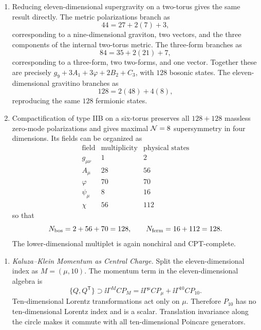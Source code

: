 \begin{enumerate}
\begin{enumerate}
      In either theory the fermions become two nine-dimensional
      gravitini and four spinors:
      \[
        2(48)+4(8)=128.
      \]
      Nine-dimensional spinors have no chirality label analogous to the
      ten-dimensional one.  The opposite-chirality IIA and
      same-chirality IIB assignments therefore reduce to the same
      nonchiral maximal nine-dimensional multiplet.
    \item Reducing eleven-dimensional supergravity on a two-torus gives
      the same result directly.  The metric polarizations branch as
      \[
        44=27+2(7)+3,
      \]
      corresponding to a nine-dimensional graviton, two vectors, and
      the three components of the internal two-torus metric.  The
      three-form branches as
      \[
        84=35+2(21)+7,
      \]
      corresponding to a three-form, two two-forms, and one vector.
      Together these are precisely
      \(g_9+3A_1+3\varphi+2B_2+C_3\), with \(128\) bosonic states.
      The eleven-dimensional gravitino branches as
      \[
        128=2(48)+4(8),
      \]
      reproducing the same \(128\) fermionic states.
    \item Compactification of type IIB on a six-torus preserves all
      \(128+128\) massless zero-mode polarizations and gives maximal
      \({\cal N}=8\) supersymmetry in four dimensions.  Its fields can be
      organized as
      \[
      \begin{array}{c|c|c}
        \text{field}&\text{multiplicity}&\text{physical states}\\ \hline
        g_{\mu\nu}&1&2\\
        A_\mu&28&56\\
        \varphi&70&70\\ \hline
        \psi_\mu&8&16\\
        \chi&56&112
      \end{array}
      \]
      so that
      \[
        N_{\rm bos}=2+56+70=128,\qquad
        N_{\rm ferm}=16+112=128.
      \]
      The lower-dimensional multiplet is again nonchiral and
      CPT-complete.
  \end{enumerate}

  \begin{enumerate}
    \item \emph{Kaluza--Klein Momentum as Central Charge.}
    Split the eleven-dimensional index as \(M=(\mu,10)\).  The momentum
      term in the eleven-dimensional algebra is
      \[
        \{Q,Q^{\mathsf T}\}\supset \ii\Gamma^M C P_M
          =\ii\Gamma^\mu C P_\mu+\ii\Gamma^{10}C P_{10}.
      \]
      Ten-dimensional Lorentz transformations act only on \(\mu\).
      Therefore \(P_{10}\) has no ten-dimensional Lorentz index and is a
      scalar.  Translation invariance along the circle makes it commute
      with all ten-dimensional Poincare generators.


\end{enumerate}
\end{enumerate}
